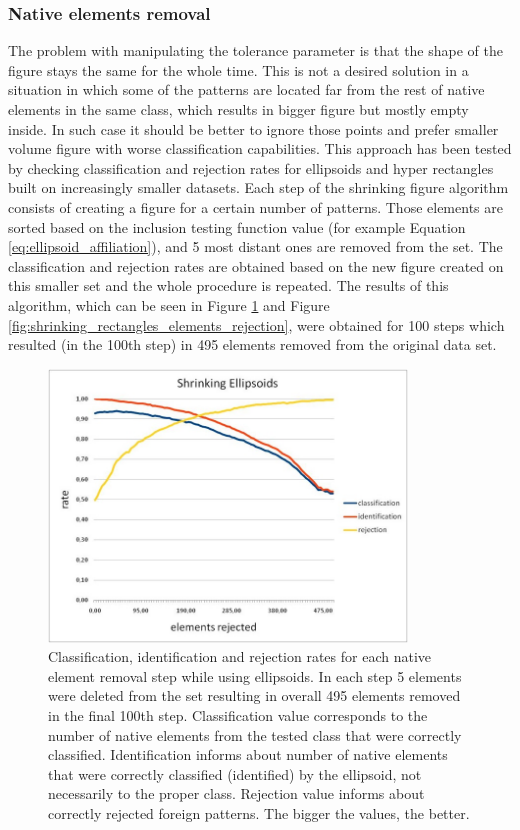 \subsubsection{Native elements removal}

The problem with manipulating the tolerance parameter is that the shape of the figure stays the same for the whole time. This is not a desired solution in a situation in which some of the patterns are located far from the rest of native elements in the same class, which results in bigger figure but mostly empty inside. In such case it should be better to ignore those points and prefer smaller volume figure with worse classification capabilities. This approach has been tested by checking classification and rejection rates for ellipsoids and hyper rectangles built on increasingly smaller datasets. Each step of the shrinking figure algorithm consists of creating a figure for a certain number of patterns. Those elements are sorted based on the inclusion testing function value (for example Equation \ref{eq:ellipsoid_affiliation}), and 5 most distant ones are removed from the set. The classification and rejection rates are obtained based on the new figure created on this smaller set and the whole procedure is repeated. The results of this algorithm, which can be seen in Figure \ref{fig:shrinking_ellipsoids_elements_rejection} and Figure \ref{fig:shrinking_rectangles_elements_rejection}, were obtained for 100 steps which resulted (in the 100th step) in 495 elements removed from the original data set.

\begin{figure}[htp]
	\centering
	\includegraphics[width=0.85\textwidth]{Figures/shrinking_ellipsoids_elements_rejection.jpg}
	\caption{ Classification, identification and rejection rates for each native element removal step while using ellipsoids. In each step 5 elements were deleted from the set resulting in overall 495 elements removed in the final 100th step. Classification value corresponds to the number of native elements from the tested class that were correctly classified. Identification informs about number of native elements that were correctly classified (identified) by the ellipsoid, not necessarily to the proper class. Rejection value informs about correctly rejected foreign patterns. The bigger the values, the better. }
	\label{fig:shrinking_ellipsoids_elements_rejection}\vspace{-3pt}
\end{figure}

